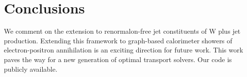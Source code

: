\section{Conclusions}\label{sec:conclusions}

We comment on the extension to renormalon-free jet constituents of W
plus jet production. Extending this framework to graph-based calorimeter
showers of electron-positron annihilation is an exciting direction for
future work. This work paves the way for a new generation of optimal
transport solvers. Our code is publicly available.

